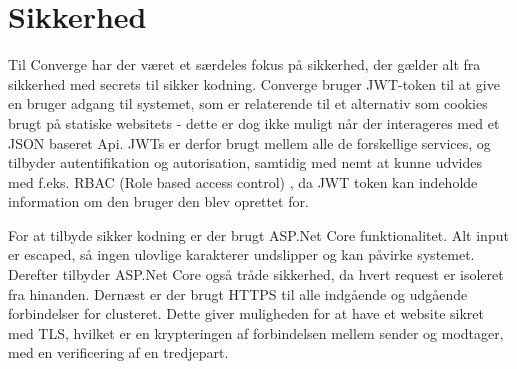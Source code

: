 \chapter{Sikkerhed}

Til Converge har der været et særdeles fokus på sikkerhed, der gælder alt fra sikkerhed med secrets til sikker kodning. Converge bruger JWT-token til at give en bruger adgang til systemet, som er relaterende til et alternativ som cookies brugt på statiske websitets - dette er dog ikke muligt når der interageres med et JSON baseret Api. JWTs er derfor brugt mellem alle de forskellige services, og tilbyder autentifikation og autorisation, samtidig med nemt at kunne udvides med f.eks. RBAC (Role based access control) \cite[RBAC]{converge-terms}, da JWT token kan indeholde information om den bruger den blev oprettet for.

For at tilbyde sikker kodning er der brugt ASP.Net Core funktionalitet. Alt input er escaped, så ingen ulovlige karakterer undslipper og kan påvirke systemet. Derefter tilbyder ASP.Net Core også tråde sikkerhed, da hvert request er isoleret fra hinanden. Dernæst er der brugt HTTPS til alle indgående og udgående forbindelser for clusteret. Dette giver muligheden for at have et website sikret med TLS, hvilket er en krypteringen af forbindelsen mellem sender og modtager, med en verificering af en tredjepart.
